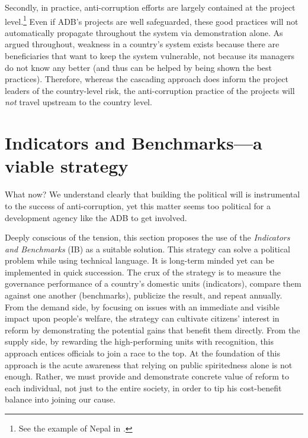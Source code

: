 \documentclass[12pt]{article}
\begin{document}
Secondly, in practice, anti-corruption efforts are largely contained at the project level.\footnote{See the example of Nepal in \citet[15]{ADB2013}.} Even if ADB's projects are well safeguarded, these good practices will not automatically propagate throughout the system via demonstration alone. As argued throughout, weakness in a country's system exists because there are beneficiaries that want to keep the system vulnerable, not because its managers do not know any better (and thus can be helped by being shown the best practices). Therefore, whereas the cascading approach does inform the project leaders of the country-level risk, the anti-corruption practice of the projects will \textit{not} travel upstream to the country level.

\section{Indicators and Benchmarks---a viable strategy} \label{sec:IB}

What now? We understand clearly that building the political will is instrumental to the success of anti-corruption, yet this matter seems too political for a development agency like the ADB to get involved.

Deeply conscious of the tension, this section proposes the use of the \textit{Indicators and Benchmarks} (IB) as a suitable solution. This strategy can solve a political problem while using technical language. It is long-term minded yet can be implemented in quick succession. The crux of the strategy is to measure the governance performance of a country's domestic units (indicators), compare them against one another (benchmarks), publicize the result, and repeat annually. From the demand side, by focusing on issues with an immediate and visible impact upon people's welfare, the strategy can cultivate citizens' interest in reform by demonstrating the potential gains that benefit them directly. From the supply side, by rewarding the high-performing units with recognition, this approach entices officials to join a race to the top. At the foundation of this approach is the acute awareness that relying on public spiritedness alone is not enough. Rather, we must provide and demonstrate concrete value of reform to each individual, not just to the entire society, in order to tip his cost-benefit balance into joining our cause.
\end{document}
